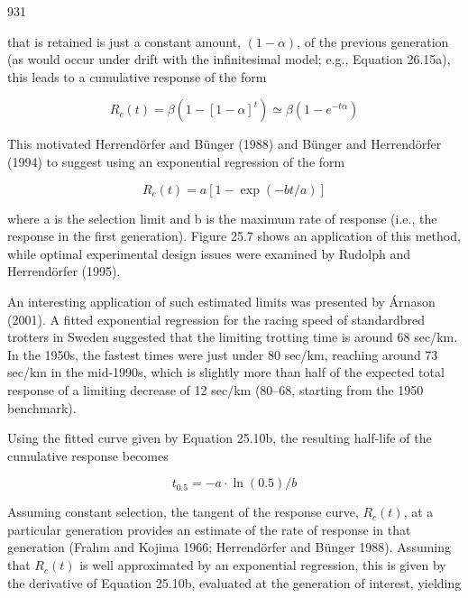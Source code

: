 \documentclass{article}
\begin{document}
931

that is retained is just a constant amount,  $ (1-\alpha) $, of the previous generation (as would occur under drift with the infinitesimal model; e.g., Equation 26.15a), this leads to a cumulative response of the form

\begin{equation}
R_{c}(t)=\beta\left(1-\left[1-\alpha\right]^{t}\right)\simeq\beta\left(1-e^{-t\alpha}\right)
\tag{25.10a}
\label{eq:25_10a}
\end{equation}

This motivated Herrendörfer and Bünger (1988) and Bünger and Herrendörfer (1994) to suggest using an exponential regression of the form

\begin{equation}
R_{c}(t)=a\left[1-\exp\left(-bt/a\right)\right]
\tag{25.10b}
\label{eq:25_10b}
\end{equation}

where a is the selection limit and b is the maximum rate of response (i.e., the response in the first generation). Figure 25.7 shows an application of this method, while optimal experimental design issues were examined by Rudolph and Herrendörfer (1995).

An interesting application of such estimated limits was presented by Árnason (2001). A fitted exponential regression for the racing speed of standardbred trotters in Sweden suggested that the limiting trotting time is around 68 sec/km. In the 1950s, the fastest times were just under 80 sec/km, reaching around 73 sec/km in the mid-1990s, which is slightly more than half of the expected total response of a limiting decrease of 12 sec/km (80–68, starting from the 1950 benchmark).

Using the fitted curve given by Equation 25.10b, the resulting half-life of the cumulative response becomes

\begin{equation}
t_{0.5}=-a\cdot\ln(0.5)/b
\tag{25.10c}
\label{eq:25_10c}
\end{equation}

Assuming constant selection, the tangent of the response curve,  $ R_{c}(t) $, at a particular generation provides an estimate of the rate of response in that generation (Frahm and Kojima 1966; Herrendörfer and Bünger 1988). Assuming that  $ R_{c}(t) $ is well approximated by an exponential regression, this is given by the derivative of Equation 25.10b, evaluated at the generation of interest, yielding
\end{document}
